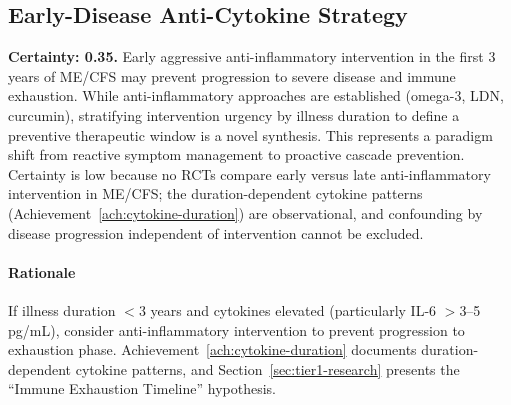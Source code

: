 \subsection{Early-Disease Anti-Cytokine Strategy}

\begin{speculation}
\label{spec:immune-exhaustion-timeline}
\textbf{Certainty: 0.35.} Early aggressive anti-inflammatory intervention in the first 3 years of ME/CFS may prevent progression to severe disease and immune exhaustion. While anti-inflammatory approaches are established (omega-3, LDN, curcumin), stratifying intervention urgency by illness duration to define a preventive therapeutic window is a novel synthesis. This represents a paradigm shift from reactive symptom management to proactive cascade prevention. Certainty is low because no RCTs compare early versus late anti-inflammatory intervention in ME/CFS; the duration-dependent cytokine patterns (Achievement~\ref{ach:cytokine-duration}) are observational, and confounding by disease progression independent of intervention cannot be excluded.
\end{speculation}

\paragraph{Rationale}
If illness duration $<$3 years and cytokines elevated (particularly IL-6 $>$3--5 pg/mL), consider anti-inflammatory intervention to prevent progression to exhaustion phase. Achievement~\ref{ach:cytokine-duration} documents duration-dependent cytokine patterns, and Section~\ref{sec:tier1-research} presents the ``Immune Exhaustion Timeline'' hypothesis.

